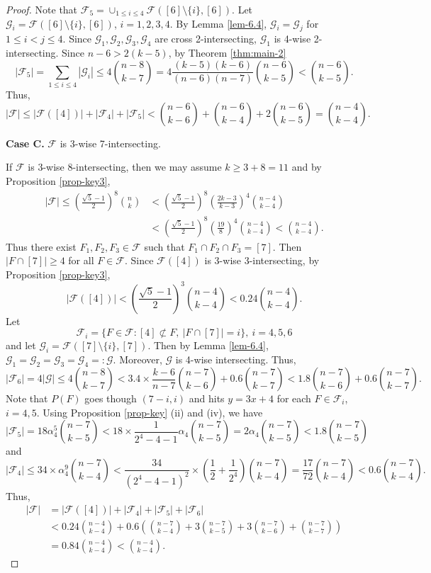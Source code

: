 \documentclass[11pt,a4paper]{article}
\newtheorem{false statement}{False statement}
\theoremstyle{definition}
\def\hf{\mathcal{F}}
\def\hg{\mathcal{G}}
\begin{document}
\begin{proof}
Note that $\hf_5= \cup_{1\leq i\leq 4} \hf([6]\setminus \{i\},[6])$. Let $\hg_i=\hf([6]\setminus \{i\},[6])$, $i=1,2,3,4$. By Lemma \ref{lem-6.4}, $\hg_i=\hg_j$ for $1\leq i<j\leq 4$. Since $\hg_1,\hg_2,\hg_3,\hg_4$ are cross 2-intersecting, $\hg_1$ is 4-wise 2-intersecting. Since $n-6>2(k-5)$, by Theorem \ref{thm:main-2}
\[
|\hf_5| = \sum_{1\leq i\leq 4}|\hg_i| \leq 4\binom{n-8}{k-7} = 4\frac{(k-5)(k-6)}{(n-6)(n-7)}\binom{n-6}{k-5}<\binom{n-6}{k-5}.
\]
Thus,
\[
|\hf| \leq |\hf([4])|+|\hf_4|+|\hf_5|< \binom{n-6}{k-6}+\binom{n-6}{k-4}+2\binom{n-6}{k-5}=\binom{n-4}{k-4}.
\]

\vspace{3pt}
{\bf Case C.} $\hf$ is 3-wise 7-intersecting.
\vspace{3pt}

If $\hf$ is 3-wise 8-intersecting, then we may assume $k\geq 3+8= 11$ and by Proposition \ref{prop-key3},
\begin{align*}
|\hf|\leq \left(\frac{\sqrt{5}-1}{2}\right)^8\binom{n}{k} &<\left(\frac{\sqrt{5}-1}{2}\right)^8 \left(\frac{2k-3}{k-3}\right)^4\binom{n-4}{k-4}\\[3pt]
&<\left(\frac{\sqrt{5}-1}{2}\right)^8 \left(\frac{19}{8}\right)^4\binom{n-4}{k-4}<\binom{n-4}{k-4}.
\end{align*}
Thus there exist $F_1,F_2,F_3\in \hf$ such that $F_1\cap F_2\cap F_3=[7]$. Then $|F\cap [7]|\geq 4$ for all $F\in \hf$. Since $\hf([4])$ is 3-wise 3-intersecting, by Proposition \ref{prop-key3},
\[
|\hf([4])| <\left(\frac{\sqrt{5}-1}{2}\right)^3\binom{n-4}{k-4} < 0.24 \binom{n-4}{k-4}.
\]
Let
\[
\hf_i= \{F\in \hf\colon [4]\not\subset F,\ |F\cap [7]|=i\}, \ i=4,5,6
\]
and let $\hg_i=\hf([7]\setminus \{i\},[7])$. Then by Lemma \ref{lem-6.4}, $\hg_1=\hg_2=\hg_3=\hg_4=:\hg$. Moreover, $\hg$ is 4-wise intersecting. Thus,
\[
|\hf_6| = 4|\hg| \leq 4\binom{n-8}{k-7}< 3.4\times\frac{k-6}{n-7}\binom{n-7}{k-6}+0.6\binom{n-7}{k-7}<1.8\binom{n-7}{k-6}+0.6\binom{n-7}{k-7}.
\]
Note that $P(F)$ goes though $(7-i,i)$ and hits $y=3x+4$  for each $F\in \hf_i$, $i=4,5$.
Using Proposition \ref{prop-key} (ii) and (iv), we  have
\[
|\hf_5| = 18\alpha_4^5 \binom{n-7}{k-5}< 18\times\frac{1}{2^4-4-1} \alpha_4 \binom{n-7}{k-5}=2\alpha_4 \binom{n-7}{k-5}<1.8\binom{n-7}{k-5}
\]
and
\[
|\hf_4| \leq 34 \times \alpha_4^9 \binom{n-7}{k-4} <\frac{34}{(2^4-4-1)^2} \times \left(\frac{1}{2}+\frac{1}{2^4}\right)\binom{n-7}{k-4}=\frac{17}{72}\binom{n-7}{k-4}<0.6\binom{n-7}{k-4}.
\]
Thus,
\begin{align*}
|\hf| &=|\hf([4])|  +|\hf_4|+|\hf_5|+|\hf_6| \\[3pt]
&<0.24\binom{n-4}{k-4}+0.6\left(\binom{n-7}{k-4}+3\binom{n-7}{k-5}+3\binom{n-7}{k-6}+\binom{n-7}{k-7}\right)\\[3pt]
&=0.84\binom{n-4}{k-4}<\binom{n-4}{k-4}.
\end{align*}
\end{proof}
\end{document}
